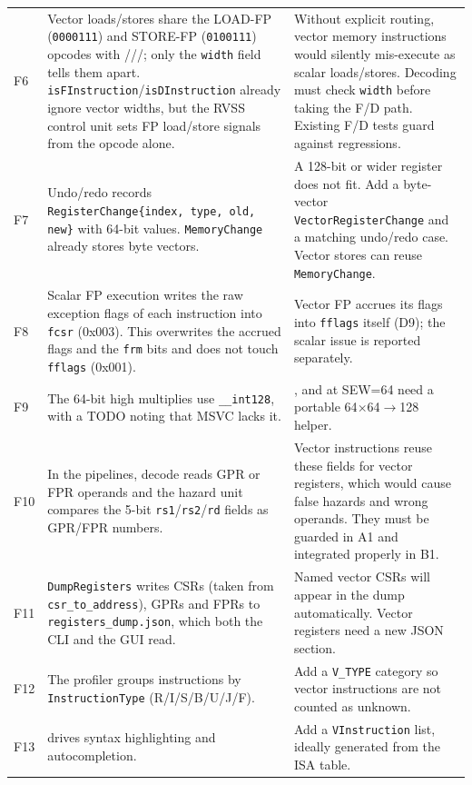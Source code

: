 \documentclass[11pt]{article}
\begin{document}
\begin{longtable}{@{}L{0.8cm}L{7.3cm}L{7.0cm}@{}}
F6 & Vector loads/stores share the LOAD-FP (\texttt{0000111}) and STORE-FP (\texttt{0100111}) opcodes with ///; only the \texttt{width} field tells them apart. \texttt{isFInstruction}/\texttt{isDInstruction} already ignore vector widths, but the RVSS control unit sets FP load/store signals from the opcode alone. &
Without explicit routing, vector memory instructions would silently mis-execute as scalar loads/stores. Decoding must check \texttt{width} before taking the F/D path. Existing F/D tests guard against regressions. \\
F7 & Undo/redo records \texttt{RegisterChange\{index, type, old, new\}} with 64-bit values. \texttt{MemoryChange} already stores byte vectors. &
A 128-bit or wider register does not fit. Add a byte-vector \texttt{VectorRegisterChange} and a matching undo/redo case. Vector stores can reuse \texttt{MemoryChange}. \\
F8 & Scalar FP execution writes the raw exception flags of each instruction into \texttt{fcsr} (0x003). This overwrites the accrued flags and the \texttt{frm} bits and does not touch \texttt{fflags} (0x001). &
Vector FP accrues its flags into \texttt{fflags} itself (D9); the scalar issue is reported separately. \\
F9 & The 64-bit high multiplies use \texttt{\_\_int128}, with a TODO noting that MSVC lacks it. & ,  and  at SEW=64 need a portable 64$\times$64$\to$128 helper. \\
F10 & In the pipelines, decode reads GPR or FPR operands and the hazard unit compares the 5-bit \texttt{rs1}/\texttt{rs2}/\texttt{rd} fields as GPR/FPR numbers. & Vector instructions reuse these fields for vector registers, which would cause false hazards and wrong operands. They must be guarded in A1 and integrated properly in B1. \\
F11 & \texttt{DumpRegisters} writes CSRs (taken from \texttt{csr\_to\_address}), GPRs and FPRs to \texttt{registers\_dump.json}, which both the CLI and the GUI read. & Named vector CSRs will appear in the dump automatically. Vector registers need a new JSON section. \\
F12 & The profiler groups instructions by \texttt{InstructionType} (R/I/S/B/U/J/F). & Add a \texttt{V\_TYPE} category so vector instructions are not counted as unknown. \\
F13 &  drives syntax highlighting and autocompletion. & Add a \texttt{VInstruction} list, ideally generated from the ISA table. \\

\end{longtable}
\end{document}
